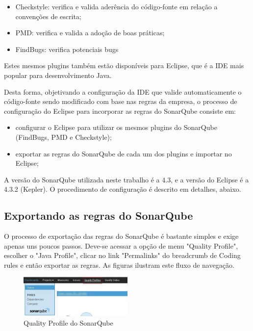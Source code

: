 \documentclass[12pt,journal,compsoc]{IEEEtran}
\begin{document}
\begin{itemize}
\item Checkstyle: verifica e valida aderência do código-fonte em relação a convenções de escrita;
\item PMD: verifica e valida a adoção de boas práticas;
\item FindBugs: verifica potenciais bugs
\end{itemize}

Estes mesmos plugins também estão disponíveis para Eclipse, que é a IDE mais popular para desenvolvimento Java\cite{java_report_2012}. 

Desta forma, objetivando a configuração da IDE que valide automaticamente o código-fonte sendo modificado com base nas regras da empresa, o processo de configuração do Eclipse para incorporar as regras do SonarQube consiste em:

\begin{itemize}
\item configurar o Eclipse para utilizar os mesmos plugins do SonarQube (FindBugs, PMD e Checkstyle); 
\item exportar as regras do SonarQube de cada um dos plugins e importar no Eclipse;
\end{itemize}

A versão do SonarQube utilizada neste trabalho é a 4.3, e a versão do Eclipse é a 4.3.2 (Kepler).
O procedimento de configuração é descrito em detalhes, abaixo.

\subsection{Exportando as regras do SonarQube}

O processo de exportação das regras do SonarQube é bastante simples e exige apenas uns poucos passos. Deve-se acessar a opção de menu "Quality Profile", escolher o "Java Profile", clicar no link "Permalinks" do breadcrumb de Coding rules e então exportar as regras. As figuras ilustram este fluxo de navegação.

\begin{figure}[ht!]
\centering
\includegraphics[width=0.5\textwidth]{img/sonar-step-01}
\caption{Quality Profile do SonarQube}
\label{sonar-step-01}
\end{figure} 
\end{document}
